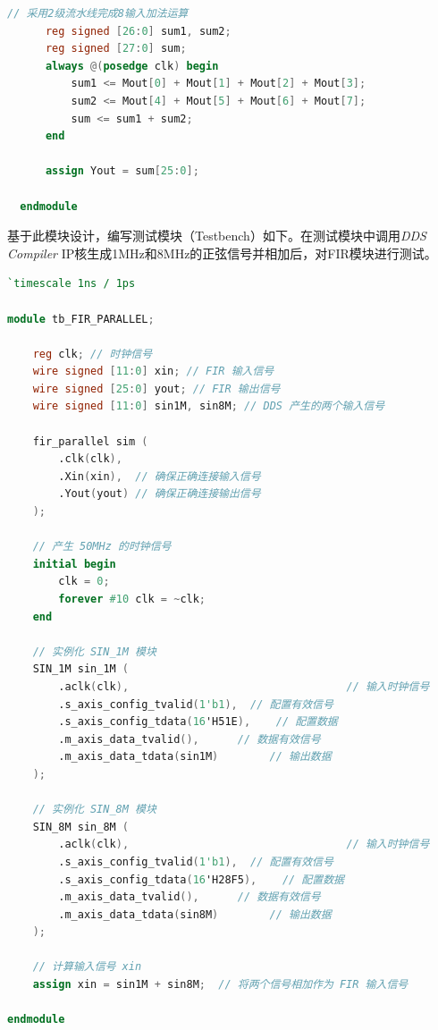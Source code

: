 \begin{lstlisting}[language=verilog,caption={FIR滤波器模块}]
      // 采用2级流水线完成8输入加法运算
      reg signed [26:0] sum1, sum2;
      reg signed [27:0] sum;
      always @(posedge clk) begin
          sum1 <= Mout[0] + Mout[1] + Mout[2] + Mout[3];
          sum2 <= Mout[4] + Mout[5] + Mout[6] + Mout[7];
          sum <= sum1 + sum2;
      end
  
      assign Yout = sum[25:0];
  
  endmodule
  \end{lstlisting}

基于此模块设计，编写测试模块（Testbench）如下。在测试模块中调用\textit{DDS Compiler} IP核生成1MHz和8MHz的正弦信号并相加后，对FIR模块进行测试。
\begin{lstlisting}[language=verilog, caption={Testbench文件}]
  `timescale 1ns / 1ps

module tb_FIR_PARALLEL;

    reg clk; // 时钟信号
    wire signed [11:0] xin; // FIR 输入信号
    wire signed [25:0] yout; // FIR 输出信号
    wire signed [11:0] sin1M, sin8M; // DDS 产生的两个输入信号

    fir_parallel sim (
        .clk(clk),
        .Xin(xin),  // 确保正确连接输入信号
        .Yout(yout) // 确保正确连接输出信号
    );

    // 产生 50MHz 的时钟信号
    initial begin
        clk = 0;
        forever #10 clk = ~clk;
    end

    // 实例化 SIN_1M 模块
    SIN_1M sin_1M (
        .aclk(clk),                                  // 输入时钟信号
        .s_axis_config_tvalid(1'b1),  // 配置有效信号
        .s_axis_config_tdata(16'H51E),    // 配置数据
        .m_axis_data_tvalid(),      // 数据有效信号
        .m_axis_data_tdata(sin1M)        // 输出数据
    );

    // 实例化 SIN_8M 模块
    SIN_8M sin_8M (
        .aclk(clk),                                  // 输入时钟信号
        .s_axis_config_tvalid(1'b1),  // 配置有效信号
        .s_axis_config_tdata(16'H28F5),    // 配置数据
        .m_axis_data_tvalid(),      // 数据有效信号
        .m_axis_data_tdata(sin8M)        // 输出数据
    );

    // 计算输入信号 xin
    assign xin = sin1M + sin8M;  // 将两个信号相加作为 FIR 输入信号

endmodule

  
\end{lstlisting}


